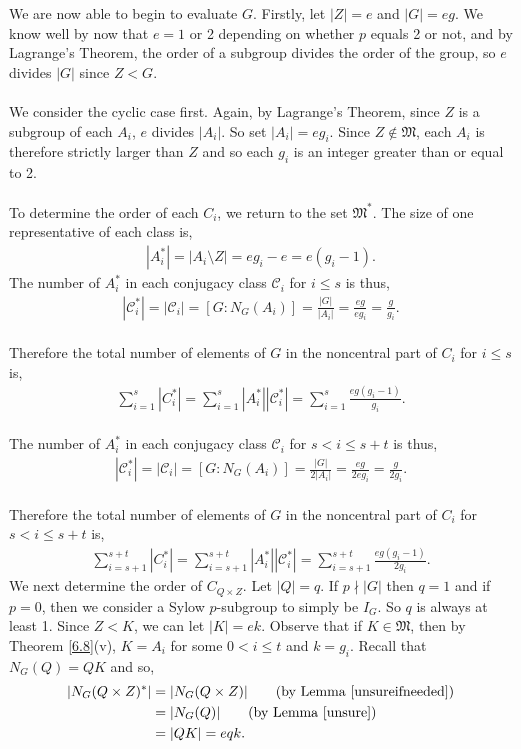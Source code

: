 \documentclass[a4paper , 11pt]{book}
\theoremstyle{definition}
\theoremstyle{remark}
\begin{document}
We are now able to begin to evaluate $G$. Firstly, let $|Z| = e$ and $|G| = eg$. We know well by now that $e = 1$ or 2 depending on whether $p$ equals 2 or not, and by Lagrange's Theorem, the order of a subgroup divides the order of the group, so $e$ divides $|G|$ since $Z < G$. \\
\\
We consider the cyclic case first. Again, by Lagrange's Theorem, since $Z$ is a subgroup of each $A_i$, $e$ divides $|A_i|$. So set $|A_i| = eg_i$. Since $Z \notin \mathfrak{M}$, each $A_i$ is therefore strictly larger than $Z$ and so each $g_i$ is an integer greater than or equal to 2. \\
\\
To determine the order of each $C_i$, we return to the set $\mathfrak{M}^*$. The size of one representative of each class is,
\begin{align*} |A_i^*| = |A_i \! \setminus \! Z| = eg_i-e = e(g_i-1). \end{align*}
The number of $A_i^*$ in each conjugacy class $\mathcal{C}_i$ for $i \leq s$ is thus,
\begin{align*} |\mathcal{C}_i^*| = |\mathcal{C}_i| = [G:N_G(A_i)] = \frac{|G|}{|A_i|} = \frac{eg}{eg_i} = \frac{g}{g_i}. \end{align*}
\\
Therefore the total number of elements of $G$ in the noncentral part of $C_i$ for $i \leq s$ is,
\begin{align} \label{classeq1of3} \sum_{i=1}^{s} |C_i^*| = \sum_{i=1}^{s} |A_i^*| |\mathcal{C}_i^*| = \sum_{i=1}^{s} \frac{eg(g_i-1)}{g_i}.
\end{align}
\\
The number of $A_i^*$ in each conjugacy class $\mathcal{C}_i$ for $s < i \leq s+t$ is thus,
\begin{align*} |\mathcal{C}_i^*| = |\mathcal{C}_i| = [G:N_G(A_i)] = \frac{|G|}{2|A_i|} = \frac{eg}{2eg_i} = \frac{g}{2g_i}. \end{align*}
\\
Therefore the total number of elements of $G$ in the noncentral part of $C_i$ for $s < i \leq s+t$ is,
\begin{align}\label{classeq2of3} \sum_{i=s+1}^{s+t} |C_i^*| = \sum_{i=s+1}^{s+t} |A_i^*| |\mathcal{C}_i^*| = \sum_{i=s+1}^{s+t} \frac{eg(g_i-1)}{2g_i}.
\end{align}
We next determine the order of $C_{Q \times Z}$. Let $|Q| = q$. If $p \nmid |G|$ then $q=1$ and if $p = 0$, then we consider a Sylow $p$-subgroup to simply be $I_G$. So $q$ is always at least 1. Since $Z < K$, we can let $|K| = ek$. Observe that if $K \in \mathfrak{M}$, then by Theorem \ref{6.8}(v), $K = A_i$ for some $0 < i \leq t$ and $k = g_i$. Recall that $N_G(Q) = QK$ and so,
\begin{align*} |N_G(Q \times Z)^*| &= |N_G(Q \times Z)|  \tag{by Lemma \ref{unsureifneeded}}
\\ &= |N_G(Q)| \tag{by Lemma \ref{unsure}}
\\ &= |QK| = eqk.
\end{align*}
\end{document}
